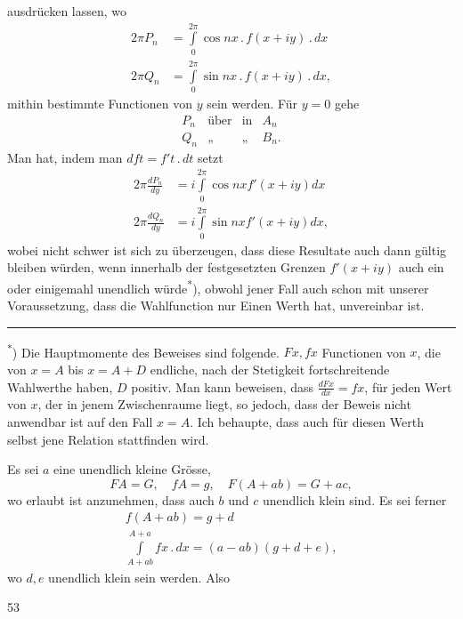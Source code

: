 \noindent ausdrücken lassen, wo
\[\begin{aligned}
2\pi P_n&=\int\limits_0^{2\pi}\cos nx\,{.}\,f(x+iy)\,{.}\,dx\\
2\pi Q_n&=\int\limits_0^{2\pi}\sin nx\,{.}\,f(x+iy)\,{.}\,dx,
\end{aligned}\]
\noindent mithin bestimmte Functionen von \(y\) sein werden. Für \(y=0\) gehe
\[\begin{array}{cccc}P_n&\text{über}&\text{in}&A_n\\Q_n&\text{„}&\text{„}&B_n.\end{array}\]
\noindent Man hat, indem man \(dft=f't\,{.}\,dt\) setzt
\[\begin{aligned}
2\pi\frac{dP_n}{dy}&=i\int\limits_0^{2\pi}\cos nx f'(x+iy)dx\\
2\pi\frac{dQ_n}{dy}&=i\int\limits_0^{2\pi}\sin nx f'(x+iy)dx,
\end{aligned}\]
\noindent wobei nicht schwer ist sich zu überzeugen, dass diese Resultate auch dann gültig bleiben würden, wenn innerhalb der festgesetzten Grenzen \(f'(x+iy)\) auch ein oder einigemahl unendlich würde\textsuperscript{*}), obwohl jener Fall auch schon mit unserer Voraussetzung, dass die Wahlfunction nur Einen Werth hat, unvereinbar ist.
\par\vfill\noindent\rule{.25\linewidth}{.4pt}\par\smallskip
{\footnotesize
\noindent\hspace*{\parindent}\textsuperscript{*}) Die Hauptmomente des Beweises sind folgende. \(Fx,fx\) Functionen von \(x\), die von \(x=A\) bis \(x=A+D\) endliche, nach der Stetigkeit fortschreitende Wahlwerthe haben, \(D\) positiv. Man kann beweisen, dass \(\frac{dFx}{dx}=fx\), für jeden Wert von \(x\), der in jenem Zwischenraume liegt, so jedoch, dass der Beweis nicht anwendbar ist auf den Fall \(x=A\). Ich behaupte, dass auch für diesen Werth selbst jene Relation stattfinden wird.

Es sei \(a\) eine unendlich kleine Grösse,
\[FA=G,\quad fA=g,\quad F(A+ab)=G+ac,\]
\noindent wo erlaubt ist anzunehmen, dass auch \(b\) und \(c\) unendlich klein sind. Es sei ferner
\[\begin{gathered}
f(A+ab)=g+d\\
\int\limits_{A+ab}^{A+a}fx\,{.}\,dx=(a-ab)(g+d+e),
\end{gathered}\]
\noindent wo \(d,e\) unendlich klein sein werden. Also\par}
\par{}\hfill{\footnotesize 53}\par
